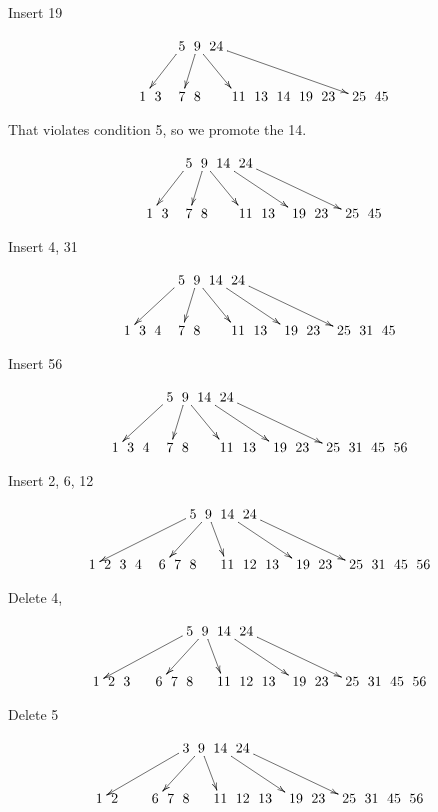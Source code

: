 \documentclass[a4paper]{article}
\begin{document}
Insert 19 

$$\xymatrix @C=0pt {
  &   &   &    & \ar[dlll] 5 &\ar[dl]  9 \ar[drr] & 24 \ar[drrrrrrr] &  \\
  & 1 & 3 &   &  7 & 8 &   &  11 & 13 & 14 & 19 & 23 &  & 25 & 45 \\
}$$

That violates condition 5, so we promote the 14.

$$\xymatrix @C=0pt {
  &   &   &    & \ar[dlll] 5 &\ar[dl]  9 \ar[drr] & 14 \ar[drrrr] & 24 \ar[drrrrrr] &  \\
  & 1 & 3 &   &  7 & 8 &   &  11 & 13 &  & 19 & 23 &  & 25 & 45 \\
}$$

Insert 4, 31

$$\xymatrix @C=0pt {
  &   &   &    & \ar[dllll] 5 &\ar[dl]  9 \ar[drr] & 14 \ar[drrrr] & 24 \ar[drrrrrr] &  \\
 1 & 3 & 4 &   &  7 & 8 &   &  11 & 13 &  & 19 & 23 &  & 25 & 31 & 45 \\
}$$

Insert 56

$$\xymatrix @C=0pt {
  &   &   &    & \ar[dllll] 5 &\ar[dl]  9 \ar[drr] & 14 \ar[drrrr] & 24 \ar[drrrrrr] &  \\
 1 & 3 & 4 &   &  7 & 8 &   &  11 & 13 &  & 19 & 23 &  & 25 & 31 & 45 & 56 \\
}$$

Insert 2, 6, 12

$$\xymatrix @C=0pt {
  &   &   &   & & & & \ar[dlllllll] 5 &\ar[dlll]  9 \ar[dr] & 14 \ar[drrrr] & 24 \ar[drrrrrr] &  \\
 1 & 2 & 3 & 4 &   &  6 & 7 & 8 &   &  11 & 12 &13 &  & 19 & 23 &  & 25 & 31 & 45 & 56 \\
}$$

Delete 4, 

$$\xymatrix @C=0pt {
  &   &   &   & & & & \ar[dlllllll] 5 &\ar[dlll]  9 \ar[dr] & 14 \ar[drrrr] & 24 \ar[drrrrrr] &  \\
 1 & 2 & 3 &  &   &  6 & 7 & 8 &   &  11 & 12 &13 &  & 19 & 23 &  & 25 & 31 & 45 & 56 \\
}$$

Delete 5

$$\xymatrix @C=0pt {
  &   &   &   & & & & \ar[dlllllll] 3 &\ar[dlll]  9 \ar[dr] & 14 \ar[drrrr] & 24 \ar[drrrrrr] &  \\
 1 & 2 &  &  &   &  6 & 7 & 8 &   &  11 & 12 &13 &  & 19 & 23 &  & 25 & 31 & 45 & 56 \\
}$$
\end{document}
